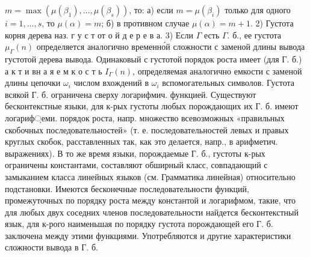 \documentclass[10pt]{article}
\begin{document}
$m=\max \left(\mu\left(\beta_{1}\right), \ldots, \mu\left(\beta_{s}\right)\right)$, то: а) если $m=\mu\left(\beta_{i}\right)$ только для одного $i=1, \ldots, s$, то $\mu(\alpha)=m$; б) в противном случае $\mu(\alpha)=m+1$. 2) Густота корня дерева наз. г у с т от о й д е р е в а. 3) Если $\Gamma$ есть $\Gamma$. б., ее густота $\mu_{\Gamma}(n)$ определяется аналогично временно́й сложности с заменой длины вывода густотой дерева вывода. Одинаковый с густотой порядок роста имеет (для Г. б.) а к т и вн а я е м к о с т ь $I_{\Gamma}(n)$, определяемая аналогично емкости с заменой длины цепочки $\omega_{i}$ числом вхождений в $\omega_{i}$ вспомогательных символов. Густота всякой Г. б. ограничена сверху логарифмич. функцией. Существуют бесконтекстные языки, для к-рых густоты любых порождающих их Г. б. имеют логариф্еми. порядок роста, напр. множество всевозможных «правильных скобочных последовательностей» (т. е. последовательностей левых и правых круглых скобок, расставленных так, как это делается, напр., в арифметич. выражениях). В то же время языки, порождаемые Г. б., густоты к-рых ограничены константами, составляют обширный класс, совпадающий с замыканием класса линейных языков (см. Грамматика линейная) относительно подстановки. Имеются бесконечные последовательности функций, промежуточных по порядку роста между константой и логарифмом, такие, что для любых двух соседних членов последовательности найдется бесконтекстный язык, для к-рого наименьшая по порядку густота порождающей его Г. б. заключена между этими функциями. Употребляются и другие характеристики сложности вывода в Г. б.
\end{document}
